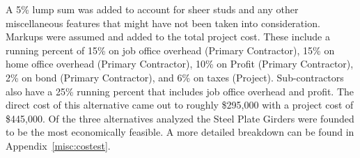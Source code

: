  A 5\% lump sum was added to account for sheer studs and any other miscellaneous features that might have not been taken into consideration. Markups were assumed and added to the total project cost. These include a running percent of 15\% on job office overhead (Primary Contractor), 15\% on home office overhead (Primary Contractor), 10\% on Profit (Primary Contractor), 2\% on bond (Primary Contractor), and 6\% on taxes (Project). Sub-contractors also have a 25\% running percent that includes job office overhead and profit. The direct cost of this alternative came out to roughly \$295,000 with a project cost of \$445,000. Of the three alternatives analyzed the Steel Plate Girders were founded to be the most economically feasible. A more detailed breakdown can be found in Appendix~\ref{misc:costest}.

\begin{table}[H]
\centering
\caption{Steel Plate Girder Alternative Cost}
\vspace{0.5cm}
\end{table}
